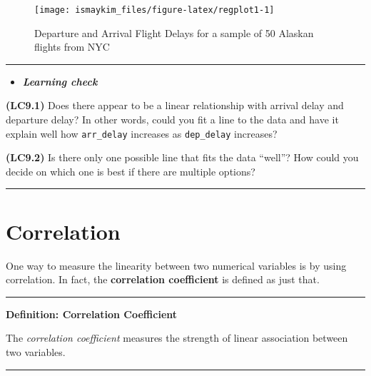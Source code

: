 \documentclass[]{tufte-book}
\let\oldrule=\rule
\renewcommand{\rule}[1]{\oldrule{\linewidth}}
\newenvironment{rmdblock}[1]
  {\begin{shaded*}
  \begin{itemize}
  \renewcommand{\labelitemi}{
    \raisebox{-.7\height}[0pt][0pt]{
    }
  }
  \item
  }
  {
  \end{itemize}
  \end{shaded*}
  }
\newenvironment{learncheck}
  {\begin{rmdblock}{warning}}
  {\end{rmdblock}}
\begin{document}
\begin{figure}

{\centering \texttt{[image: ismaykim\_files/figure-latex/regplot1-1]} 

}

\caption[Departure and Arrival Flight Delays for a sample of 50 Alaskan flights from NYC]{Departure and Arrival Flight Delays for a sample of 50 Alaskan flights from NYC}\label{fig:regplot1}
\end{figure}

\begin{center}\rule{0.5\linewidth}{\linethickness}\end{center}

\begin{learncheck}
\textbf{\emph{Learning check}}
\end{learncheck}

\textbf{(LC9.1)} Does there appear to be a linear relationship with
arrival delay and departure delay? In other words, could you fit a line
to the data and have it explain well how \texttt{arr\_delay} increases
as \texttt{dep\_delay} increases?

\textbf{(LC9.2)} Is there only one possible line that fits the data
``well''? How could you decide on which one is best if there are
multiple options?

\begin{center}\rule{0.5\linewidth}{\linethickness}\end{center}

\section{Correlation}\label{correlation}

One way to measure the linearity between two numerical variables is by
using correlation. In fact, the \textbf{correlation coefficient} is
defined as just that.

\begin{center}\rule{0.5\linewidth}{\linethickness}\end{center}

\textbf{Definition: Correlation Coefficient}

The \emph{correlation coefficient} measures the strength of linear
association between two variables.

\begin{center}\rule{0.5\linewidth}{\linethickness}\end{center}
\end{document}
